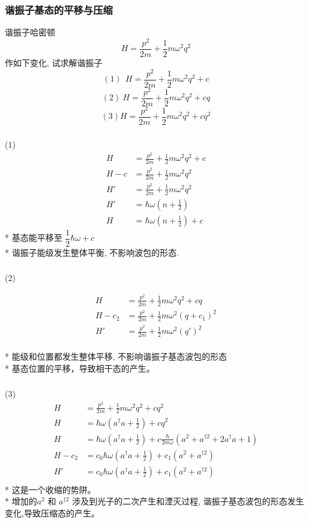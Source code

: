 \begin{frame}
 \frametitle{谐振子基态的平移与压缩}
 谐振子哈密顿
 \[  H= \frac{p^2}{2m} +\frac{1}{2}m \omega^2 q^2\]
 作如下变化, 试求解谐振子 
 \[ (1) ~~H= \frac{p^2}{2m} +\frac{1}{2}m \omega^2 q^2 +c \]
 \[ (2) ~H= \frac{p^2}{2m} +\frac{1}{2}m \omega^2 q^2 +cq\]
 \[ (3) H= \frac{p^2}{2m} +\frac{1}{2}m \omega^2 q^2 +cq^2\]
 \end{frame}
 
 \begin{frame}
       \frametitle{}     
  \解 (1) 
    \[\begin{aligned}
    H &= \frac{p^2}{2m} +\frac{1}{2}m \omega^2 q^2 +c \\  
    H-c &= \frac{p^2}{2m} +\frac{1}{2}m \omega^2 q^2  \\ 
    H' &= \frac{p^2}{2m} +\frac{1}{2}m \omega^2 q^2  \\  
    H' &=\hbar \omega (n+\frac{1}{2}) \\ 
    H &= \hbar \omega (n+\frac{1}{2}) +c
    \end{aligned} \]  
* 基态能平移至 $\dfrac{1}{2}\hbar \omega + c$ \\ 
* 谐振子能级发生整体平衡, 不影响波包的形态.   
\end{frame}

\begin{frame}
 \frametitle{}
 (2) 

   \[\begin{aligned}
    H &= \frac{p^2}{2m} +\frac{1}{2}m \omega^2 q^2 +cq \\ 
    H-c_2 &= \frac{p^2}{2m} +\frac{1}{2}m \omega^2 (q+c_1)^2  \\ 
    H' &= \frac{p^2}{2m} +\frac{1}{2}m \omega^2 (q')^2  \\ 
   \end{aligned} \]    
  
 * 能级和位置都发生整体平移, 不影响谐振子基态波包的形态 \\ 
 * 基态位置的平移，导致相干态的产生。
\end{frame}

\begin{frame}
 \frametitle{}
  (3)  
    \[\begin{aligned}
        H &= \frac{p^2}{2m} +\frac{1}{2}m \omega^2 q^2 +cq^2 \\ 
        H &= \hbar \omega (a^\dagger a +\frac{1}{2}) +cq^2  \\ 
        H  &= \hbar \omega (a^\dagger a +\frac{1}{2}) +c \frac{\hbar}{2m \omega} (a^2 + a^{\dagger 2} + 2 a^\dagger a +1 ) \\ 
        H-c_2 &= c_0\hbar \omega (a^\dagger a +\frac{1}{2}) +c_1 (a^2 + a^{\dagger 2})  \\ 
        H' &= c_0\hbar \omega (a^\dagger a +\frac{1}{2}) +c_1 (a^2 + a^{\dagger 2})  \\ 
    \end{aligned} \]    
    * 这是一个收缩的势阱。\\
    * 增加的$a^2$ 和 $a^{\dagger 2}$ 涉及到光子的二次产生和湮灭过程, 谐振子基态波包的形态发生变化,导致压缩态的产生。
\end{frame}

